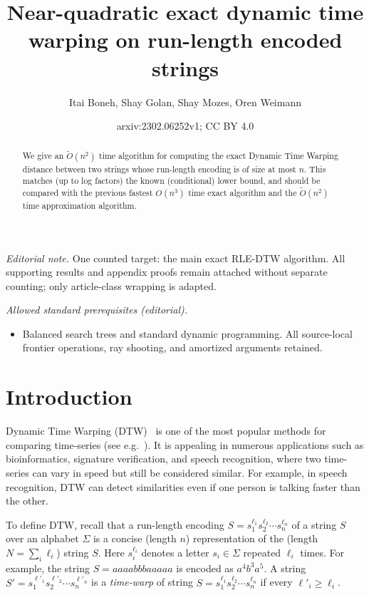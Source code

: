 \documentclass[10pt,a4paper]{article}
\title{Near-quadratic exact dynamic time warping on run-length encoded strings}
\author{Itai Boneh, Shay Golan, Shay Mozes, Oren Weimann}
\date{arxiv:2302.06252v1; CC BY 4.0}
\begin{document}
\maketitle
\noindent\textit{Editorial note.} One counted target: the main exact RLE-DTW algorithm. All supporting results and appendix proofs remain attached without separate counting; only article-class wrapping is adapted.\par\medskip
\noindent\textit{Allowed standard prerequisites (editorial).}\begin{itemize}
\item Balanced search trees and standard dynamic programming. All source-local frontier operations, ray shooting, and amortized arguments retained.
\end{itemize}\medskip
\begin{abstract}
We give an $\tilde O(n^2)$ time algorithm for computing the exact Dynamic Time Warping  distance between two strings whose run-length encoding is of size at most $n$. This matches (up to log factors) the known (conditional) lower bound, and should be compared with the previous fastest $O(n^3)$ time exact algorithm and the $\tilde O(n^2)$ time approximation algorithm.  
\end{abstract}

\section{Introduction}
\label{section:introduction}

Dynamic Time Warping (DTW)~\cite{vintzyuk1968} is one of the most popular methods for comparing time-series (see e.g.~\cite{DBLP:journals/pr/Liao05,dtwapp1,dtwapp2,dtwapp3,dtwapp4,dtwapp6,WMDTSK13,ASW15,BLBLK17}). It is appealing in numerous applications such as bioinformatics, signature verification, and speech recognition, where two time-series can vary in speed but still be considered similar. For example, in speech recognition, DTW can detect similarities even if one person is talking faster than the other.  

To define DTW, recall that a run-length encoding $S=s_1^{\ell_1} s_2^{\ell_2} \cdots s_n^{\ell_n}$ of a string $S$ over an alphabet $\Sigma$ is a concise (length $n$) representation of the (length $N=\sum_i \ell_i$) string $S$. Here $s_i^{\ell_i}$ denotes a letter $s_i\in\Sigma$ repeated $\ell_i$ times.
For example, the string $S= aaaabbbaaaaa$ is encoded as $a^4 b^3 a^5$.
A string $S'=s_1^{\ell'_1} s_2^{\ell'_2} \cdots s_n^{\ell'_n}$ is a {\em time-warp} of string $S=s_1^{\ell_1} s_2^{\ell_2} \cdots s_n^{\ell_n}$ if  every $\ell'_i \ge \ell_i$.   
\end{document}
